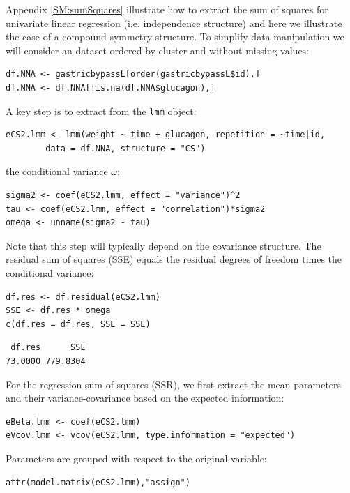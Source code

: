 \documentclass[12pt]{article}
\begin{document}
\bigskip

Appendix \ref{SM:sumSquares} illustrate how to extract the sum of squares
for univariate linear regression (i.e. independence structure) and
here we illustrate the case of a compound symmetry structure.  To
simplify data manipulation we will consider an dataset ordered by
cluster and without missing values:
\lstset{language=r,label= ,caption= ,captionpos=b,numbers=none}
\begin{lstlisting}
df.NNA <- gastricbypassL[order(gastricbypassL$id),]
df.NNA <- df.NNA[!is.na(df.NNA$glucagon),]
\end{lstlisting}

A key step is to extract from the \texttt{lmm} object:
\lstset{language=r,label= ,caption= ,captionpos=b,numbers=none}
\begin{lstlisting}
eCS2.lmm <- lmm(weight ~ time + glucagon, repetition = ~time|id,
		data = df.NNA, structure = "CS")
\end{lstlisting}

the conditional variance \(\omega\):
\lstset{language=r,label= ,caption= ,captionpos=b,numbers=none}
\begin{lstlisting}
sigma2 <- coef(eCS2.lmm, effect = "variance")^2
tau <- coef(eCS2.lmm, effect = "correlation")*sigma2
omega <- unname(sigma2 - tau)
\end{lstlisting}

Note that this step will typically depend on the covariance
structure. The residual sum of squares (SSE) equals the residual
degrees of freedom times the conditional variance:
\lstset{language=r,label= ,caption= ,captionpos=b,numbers=none}
\begin{lstlisting}
df.res <- df.residual(eCS2.lmm)
SSE <- df.res * omega
c(df.res = df.res, SSE = SSE)
\end{lstlisting}

\begin{verbatim}
 df.res      SSE 
73.0000 779.8304
\end{verbatim}


For the regression sum of squares (SSR), we first extract the mean
parameters and their variance-covariance based on the expected
information:
\lstset{language=r,label= ,caption= ,captionpos=b,numbers=none}
\begin{lstlisting}
eBeta.lmm <- coef(eCS2.lmm)
eVcov.lmm <- vcov(eCS2.lmm, type.information = "expected")
\end{lstlisting}

Parameters are grouped with respect to the original variable:
\lstset{language=r,label= ,caption= ,captionpos=b,numbers=none}
\begin{lstlisting}
attr(model.matrix(eCS2.lmm),"assign")
\end{lstlisting}
\end{document}
